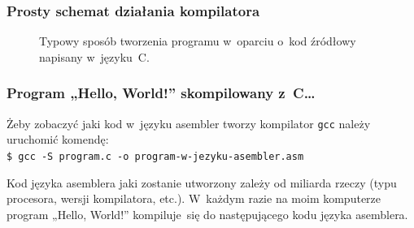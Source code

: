 \documentclass[10pt,t]{beamer}
\begin{document}
\begin{frame}
  \frametitle{Prosty schemat działania kompilatora}


  \begin{figure}


    \caption{Typowy sposób tworzenia programu w~oparciu o~kod źródłowy
      napisany w~języku~C.}


  \end{figure}

\end{frame}





\begin{frame}
  \frametitle{Program „Hello, World!” skompilowany z~C\ldots}


  Żeby zobaczyć jaki kod w~języku asembler tworzy kompilator \texttt{gcc}
  należy uruchomić komendę: \\
  \texttt{\$ gcc -S program.c -o program-w-jezyku-asembler.asm}

  Kod języka asemblera jaki zostanie utworzony zależy od miliarda rzeczy
  (typu procesora, wersji kompilatora, etc.). W~każdym razie na moim
  komputerze program „Hello, World!” kompiluje~się do następującego kodu
  języka asemblera.

\end{frame}
\end{document}
